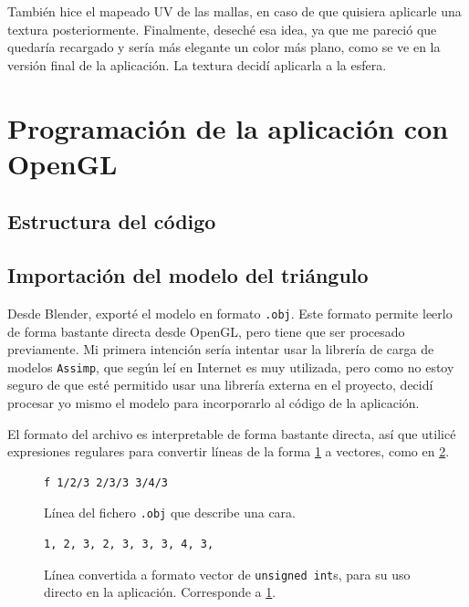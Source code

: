 \documentclass[a4paper,12pt]{article}
\begin{document}
También hice el mapeado UV de las mallas, en caso de que quisiera aplicarle una textura posteriormente. Finalmente, deseché esa idea, ya que me pareció que quedaría recargado y sería más elegante un color más plano, como se ve en la versión final de la aplicación. La textura decidí aplicarla a la esfera.

\section{Programación de la aplicación con OpenGL}
\subsection{Estructura del código}

\subsection{Importación del modelo del triángulo}

Desde Blender, exporté el modelo en formato \texttt{.obj}. Este formato permite leerlo de forma bastante directa desde OpenGL, pero tiene que ser procesado previamente. Mi primera intención sería intentar usar la librería de carga de modelos \texttt{Assimp}, que según leí en Internet es muy utilizada, pero como no estoy seguro de que esté permitido usar una librería externa en el proyecto, decidí procesar yo mismo el modelo para incorporarlo al código de la aplicación.

El formato del archivo es interpretable de forma bastante directa, así que utilicé expresiones regulares para convertir líneas de la forma \ref{lineas_obj} a vectores, como en \ref{lineas_obj_convertidas}.

\begin{figure}
    \centering
    \begin{minipage}[c]{0.7\textwidth}
        \begin{lstlisting}
f 1/2/3 2/3/3 3/4/3
        \end{lstlisting}
    \end{minipage}
    \caption{Línea del fichero \texttt{.obj} que describe una cara.} \label{lineas_obj}
\end{figure}
\begin{figure}
    \centering
    \begin{minipage}[c]{0.7\textwidth}
        \begin{lstlisting}
1, 2, 3, 2, 3, 3, 3, 4, 3,
        \end{lstlisting}
    \end{minipage}
    \caption{Línea convertida a formato vector de \texttt{unsigned int}s, para su uso directo en la aplicación. Corresponde a \ref{lineas_obj}.} \label{lineas_obj_convertidas}
\end{figure}
\end{document}
